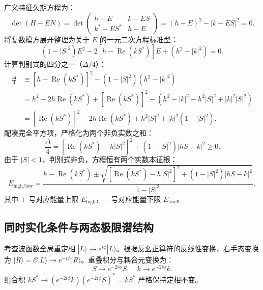 广义特征久期方程为：
\begin{equation}\label{eq:appB-two-state-det}
\det(H - E N) = \det \begin{pmatrix} h - E & k - E S \\ k^* - E S^* & h - E \end{pmatrix} = (h - E)^2 - |k - E S|^2 = 0.
\end{equation}
将复数模方展开整理为关于 $E$ 的一元二次方程标准型：
\begin{equation}\label{eq:appB-quadratic-standard}
(1 - |S|^2) E^2 - 2 \left[ h - \operatorname{Re}(k S^*) \right] E + \left( h^2 - |k|^2 \right) = 0.
\end{equation}
计算判别式的四分之一（$\Delta / 4$）：
\begin{align}\label{eq:appB-discriminant}
\frac{\Delta}{4} &\equiv \left[ h - \operatorname{Re}(k S^*) \right]^2 - (1 - |S|^2)(h^2 - |k|^2) \nonumber \\
&= h^2 - 2 h \operatorname{Re}(k S^*) + [\operatorname{Re}(k S^*)]^2 - \left( h^2 - |k|^2 - h^2 |S|^2 + |k|^2 |S|^2 \right) \nonumber \\
&= [\operatorname{Re}(k S^*)]^2 - 2 h \operatorname{Re}(k S^*) + h^2 |S|^2 + |k|^2 (1 - |S|^2).
\end{align}
配凑完全平方项，严格化为两个非负实数之和：
\begin{equation}\label{eq:appB-disc-sum-squares}
\frac{\Delta}{4} = \left[ \operatorname{Re}(k S^*) - h |S|^2 \right]^2 + (1 - |S|^2) |h S - k|^2 \ge 0.
\end{equation}
由于 $|S| < 1$，判别式非负，方程恒有两个实数本征根：
\begin{equation}\label{eq:appB-exact-roots}
E_{\text{high}/\text{low}} = \frac{h - \operatorname{Re}(k S^*) \pm \sqrt{ \left[ \operatorname{Re}(k S^*) - h |S|^2 \right]^2 + (1 - |S|^2) |h S - k|^2 }}{1 - |S|^2},
\end{equation}
其中 $+$ 号对应能量上限 $E_{\text{high}}$，$-$ 号对应能量下限 $E_{\text{low}}$。

\subsection{同时实化条件与两态极限谱结构}

考查波函数全局重定相 $|L\rangle \to e^{i\phi} |L\rangle$。根据反幺正算符的反线性变换，右手态变换为 $|R\rangle = \mathcal{C}|L\rangle \to e^{-i\phi} |R\rangle$。重叠积分与耦合元变换为：
\begin{equation}
S \to e^{-2i\phi} S, \quad k \to e^{-2i\phi} k.
\end{equation}
组合积 $k S^* \to (e^{-2i\phi} k)(e^{-2i\phi} S)^* = k S^*$ 严格保持定相不变。


